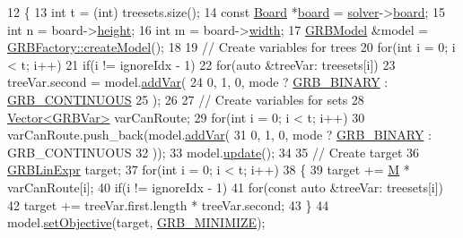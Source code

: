 \begin{DoxyCode}
12 \{
13     \textcolor{keywordtype}{int} t = (int) treesets.size();
14     \textcolor{keyword}{const} \hyperlink{classBoard}{Board} *\hyperlink{classes_8txt_ab2104b75e0965a7c5fc13208045d9b59}{board} = \hyperlink{classSolveStrategy_a94d43c47305176d0d3858697d3410443}{solver}->\hyperlink{classSolver_a8966a22c2f247addc8ce453d119bc54e}{board};
15     \textcolor{keywordtype}{int} n = board->\hyperlink{classBoard_aa0cb8de0254520dc08dab5796643c8e5}{height};
16     \textcolor{keywordtype}{int} m = board->\hyperlink{classBoard_a90a8efaa4736af25511ac948bdd27d6c}{width};
17     \hyperlink{classGRBModel}{GRBModel} &model = \hyperlink{classGRBFactory_aadd50eacec778be1265b494b4348fe8c}{GRBFactory::createModel}();
18     
19     \textcolor{comment}{// Create variables for trees}
20     \textcolor{keywordflow}{for}(\textcolor{keywordtype}{int} i = 0; i < t; i++)
21         \textcolor{keywordflow}{if}(i != ignoreIdx - 1)
22             \textcolor{keywordflow}{for}(\textcolor{keyword}{auto} &treeVar: treesets[i])
23                 treeVar.second = model.\hyperlink{classGRBModel_af31f99d256c700fa34ef0c9efdd76d98}{addVar}(
24                     0, 1, 0, mode ? \hyperlink{gurobi__c_8h_af253f5e12cd48e0718eac5d4cb4f161d}{GRB\_BINARY} : \hyperlink{gurobi__c_8h_a6cc9be6c5a5942fae165ac67f0b55c09}{GRB\_CONTINUOUS}
25                 );
26     
27     \textcolor{comment}{// Create variables for sets}
28     \hyperlink{classVector}{Vector<GRBVar>} varCanRoute;
29     \textcolor{keywordflow}{for}(\textcolor{keywordtype}{int} i = 0; i < t; i++)
30         varCanRoute.push\_back(model.\hyperlink{classGRBModel_af31f99d256c700fa34ef0c9efdd76d98}{addVar}(
31             0, 1, 0, mode ? \hyperlink{gurobi__c_8h_af253f5e12cd48e0718eac5d4cb4f161d}{GRB\_BINARY} : GRB\_CONTINUOUS
32         ));
33     model.\hyperlink{classGRBModel_a7662994a5e461c9fa82345f93985e043}{update}();
34     
35     \textcolor{comment}{// Create target}
36     \hyperlink{classGRBLinExpr}{GRBLinExpr} target;
37     \textcolor{keywordflow}{for}(\textcolor{keywordtype}{int} i = 0; i < t; i++)
38     \{
39         target += \hyperlink{classColumnGenSolve_ac5abb4d6dfd291b01af6ea006b5f9f5d}{M} * varCanRoute[i];
40         \textcolor{keywordflow}{if}(i != ignoreIdx - 1)
41             \textcolor{keywordflow}{for}(\textcolor{keyword}{const} \textcolor{keyword}{auto} &treeVar: treesets[i])
42                 target += treeVar.first.length * treeVar.second;
43     \}
44     model.\hyperlink{classGRBModel_a408a224373e26cb163510c5352577d51}{setObjective}(target, \hyperlink{gurobi__c_8h_ad4477c4c3cade685194ae6957edce447}{GRB\_MINIMIZE});

\end{DoxyCode}

